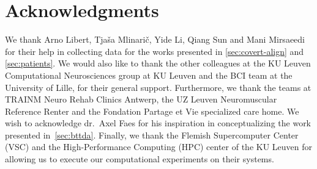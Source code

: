 \chapter*{Acknowledgments}
We thank Arno Libert,
Tjaša Mlinarič, Yide Li, Qiang Sun and Mani Mirsaeedi for their help in collecting data
for the works presented in \cref{sec:covert-align} and
\cref{sec:patients}.
We would also like to thank the other colleagues at the KU Leuven Computational
Neurosciences group at KU Leuven and the BCI team at the University of Lille,
for their general support.
Furthermore, we thank the teams at TRAINM Neuro Rehab Clinics Antwerp,
the UZ Leuven Neuromuscular Reference Renter and the Fondation Partage et Vie
specialized care home.
We wish to acknowledge dr.\ Axel Faes for his inspiration in conceptualizing
the work presented in~\cref{sec:bttda}.
Finally, we thank the Flemish Supercomputer Center (VSC) and the High-Performance
Computing (HPC) center of the KU Leuven for allowing us to execute our
computational experiments on their systems.
